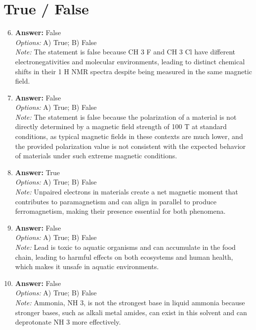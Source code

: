 \documentclass[12pt]{article}
\begin{document}
\section*{True / False}
\begin{enumerate}[label=\arabic*.]
\setcounter{enumi}{5}
\item \textbf{Answer:} False
\\ \textit{Options:} A) True; B) False
\\ \textit{Note:} The statement is false because CH 3 F and CH 3 Cl have different electronegativities and molecular environments, leading to distinct chemical shifts in their 1 H NMR spectra despite being measured in the same magnetic field.
\item \textbf{Answer:} False
\\ \textit{Options:} A) True; B) False
\\ \textit{Note:} The statement is false because the polarization of a material is not directly determined by a magnetic field strength of 100 T at standard conditions, as typical magnetic fields in these contexts are much lower, and the provided polarization value is not consistent with the expected behavior of materials under such extreme magnetic conditions.
\item \textbf{Answer:} True
\\ \textit{Options:} A) True; B) False
\\ \textit{Note:} Unpaired electrons in materials create a net magnetic moment that contributes to paramagnetism and can align in parallel to produce ferromagnetism, making their presence essential for both phenomena.
\item \textbf{Answer:} False
\\ \textit{Options:} A) True; B) False
\\ \textit{Note:} Lead is toxic to aquatic organisms and can accumulate in the food chain, leading to harmful effects on both ecosystems and human health, which makes it unsafe in aquatic environments.
\item \textbf{Answer:} False
\\ \textit{Options:} A) True; B) False
\\ \textit{Note:} Ammonia, NH 3, is not the strongest base in liquid ammonia because stronger bases, such as alkali metal amides, can exist in this solvent and can deprotonate NH 3 more effectively.
\end{enumerate}
\end{document}
